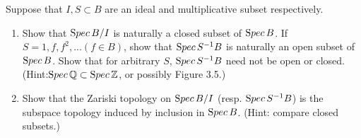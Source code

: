 \documentclass[11pt,fleqn]{book}
\begin{document}
\begin{exr}
Suppose that $I, S \subset B$ are an ideal and multiplicative subset respectively.
\begin{enumerate}[label=(\alph*)]
\item Show that ${\text Spec\,} B/I$ is naturally a closed subset of ${\text Spec\,} B$. If $S = {1,f,f^2,...} (f \in B)$, show that ${\text Spec\,} S^{-1}B$ is naturally an open subset of ${\text Spec\,} B$. Show that for arbitrary $S$, ${\text Spec\,} S^{-1}B$ need not be open or closed. (Hint:$ {\text Spec\,} \mathbb Q \subset {\text Spec\,} \mathbb Z$, or possibly Figure 3.5.)
\item  Show that the Zariski topology on ${\text Spec\,} B/I$ (resp. ${\text Spec\,} S^{-1}B$) is the subspace topology induced by inclusion in ${\text Spec\,} B$. (Hint: compare closed subsets.)
\end{enumerate}
\end{exr}
\end{document}
